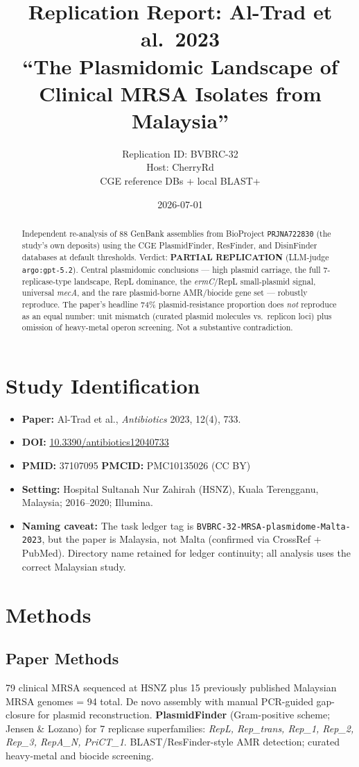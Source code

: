 \documentclass[11pt]{article}
\title{Replication Report: Al-Trad et al.\ 2023 \\
\large ``The Plasmidomic Landscape of Clinical MRSA Isolates from Malaysia''}
\author{Replication ID: BVBRC-32 \\ Host: CherryRd \\ CGE reference DBs + local BLAST+}
\date{2026-07-01}
\begin{document}
\maketitle

\begin{abstract}
Independent re-analysis of 88 GenBank assemblies from BioProject
\texttt{PRJNA722830} (the study's own deposits) using the CGE PlasmidFinder,
ResFinder, and DisinFinder databases at default thresholds. Verdict:
\textbf{PARTIAL REPLICATION} (LLM-judge \texttt{argo:gpt-5.2}). Central
plasmidomic conclusions --- high plasmid carriage, the full 7-replicase-type
landscape, RepL dominance, the \emph{ermC}/RepL small-plasmid signal,
universal \emph{mecA}, and the rare plasmid-borne AMR/biocide gene set ---
robustly reproduce. The paper's headline 74\% plasmid-resistance proportion
does \emph{not} reproduce as an equal number: unit mismatch (curated plasmid
molecules vs.\ replicon loci) plus omission of heavy-metal operon screening.
Not a substantive contradiction.
\end{abstract}

\section{Study Identification}
\begin{itemize}[leftmargin=1.5em]
  \item \textbf{Paper:} Al-Trad et al., \emph{Antibiotics} 2023, 12(4), 733.
  \item \textbf{DOI:} \href{https://doi.org/10.3390/antibiotics12040733}{10.3390/antibiotics12040733}
  \item \textbf{PMID:} 37107095 \quad \textbf{PMCID:} PMC10135026 (CC BY)
  \item \textbf{Setting:} Hospital Sultanah Nur Zahirah (HSNZ), Kuala
        Terengganu, Malaysia; 2016--2020; Illumina.
  \item \textbf{Naming caveat:} The task ledger tag is
        \texttt{BVBRC-32-MRSA-plasmidome-Malta-2023}, but the paper is
        Malaysia, not Malta (confirmed via CrossRef + PubMed). Directory
        name retained for ledger continuity; all analysis uses the correct
        Malaysian study.
\end{itemize}

\section{Methods}

\subsection{Paper Methods}
79 clinical MRSA sequenced at HSNZ plus 15 previously published Malaysian
MRSA genomes = 94 total. De novo assembly with manual PCR-guided
gap-closure for plasmid reconstruction. \textbf{PlasmidFinder}
(Gram-positive scheme; Jensen \& Lozano) for 7 replicase superfamilies:
\emph{RepL, Rep\_trans, Rep\_1, Rep\_2, Rep\_3, RepA\_N, PriCT\_1}.
BLAST/ResFinder-style AMR detection; curated heavy-metal and biocide
screening.
\end{document}
